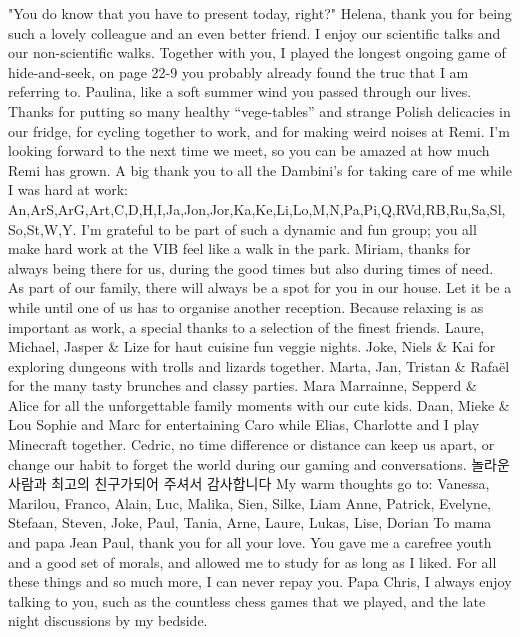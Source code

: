 "You do know that you have to present today, right?"
\newperson
\newperson
Helena, thank you for being such a lovely colleague and an even better friend.
I enjoy our scientific talks and our non-scientific walks.
Together with you, I played the longest ongoing game of hide-and-seek,
on page 22-9 you probably already found the truc that I am referring to.
\newperson
\newperson
Paulina, like a soft summer wind you passed through our lives.
Thanks for putting so many healthy “vege-tables” and strange Polish delicacies in our fridge,
for cycling together to work, and for making weird noises at Remi.
I'm looking forward to the next time we meet, so you can be amazed at how much Remi has grown.
\newperson
\newperson
A big thank you to all the Dambini's for taking care of me while I was hard at work:
An,ArS,ArG,Art,C,D,H,I,Ja,Jon,Jor,Ka,Ke,Li,Lo,M,N,Pa,Pi,Q,RVd,RB,Ru,Sa,Sl,So,St,W,Y.
I'm grateful to be part of such a dynamic and fun group;
you all make hard work at the VIB feel like a walk in the park.
\newperson
\newperson
Miriam, thanks for always being there for us, 
during the good times but also during times of need.
As part of our family, there will always be a spot for you in our house.
Let it be a while until one of us has to organise another reception.
\newperson
\newperson
Because relaxing is as important as work,
a special thanks to a selection of the finest friends.
Laure, Michael, Jasper \& Lize for haut cuisine fun veggie nights.
Joke, Niels \& Kai for exploring dungeons with trolls and lizards together.
Marta, Jan, Tristan \& Rafaël for the many tasty brunches and classy parties.
Mara Marrainne, Sepperd \& Alice for all the unforgettable family moments with our cute kids.
Daan, Mieke \& Lou
Sophie and Marc for entertaining Caro while Elias, Charlotte and I play Minecraft together.
\newperson
\newperson
Cedric, no time difference or distance can keep us apart,
or change our habit to forget the world during our gaming and conversations. 
놀라운 사람과 최고의 친구가되어 주셔서 감사합니다
\newperson
\newperson
My warm thoughts go to:
Vanessa, Marilou, Franco, Alain, Luc, Malika, Sien, Silke, Liam
Anne, Patrick, Evelyne, Stefaan, Steven, Joke, Paul, Tania, Arne, Laure, Lukas, Lise, Dorian
\newperson
\newperson
To mama and papa Jean Paul, thank you for all your love.
You gave me a carefree youth and a good set of morals,
and allowed me to study for as long as I liked.
For all these things and so much more, I can never repay you.
\newperson
\newperson
Papa Chris, I always enjoy talking to you, such as the countless
chess games that we played, and the late night discussions by my bedside.
